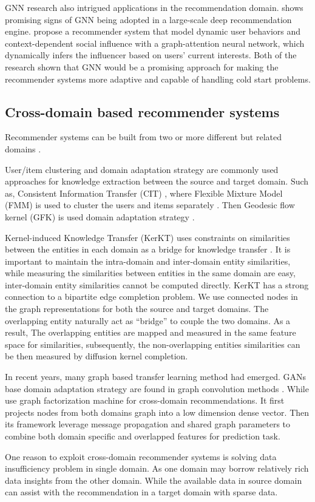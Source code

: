 GNN research also intrigued applications in the recommendation domain. \citet{ying2018graph} shows promising signs of GNN being adopted in a large-scale deep recommendation engine. \citet{song2019session} propose a recommender system that model dynamic user behaviors and context-dependent social influence with a graph-attention neural network, which dynamically infers the influencer based on users’ current interests. Both of the research shown that GNN would be a promising approach for making the recommender systems more adaptive and capable of handling cold start problems.

\subsection{Cross-domain based recommender systems}
Recommender systems can be built from two or more different but related domains \citep{fernandez2012cross}.

User/item clustering and domain adaptation strategy are commonly used approaches for knowledge extraction between the source and target domain. Such as, Consistent Information Transfer (CIT) \citep{zhang2017cross}, where Flexible Mixture Model (FMM) is used to cluster the users and items separately \citep{si2003flexible}. Then Geodesic flow kernel (GFK) is used domain adaptation strategy \citep{gong2014learning}.

Kernel-induced Knowledge Transfer (KerKT) uses constraints on similarities between the entities in each domain as a bridge for knowledge transfer \citep{zhang2018cross}. It is important to maintain the intra-domain and inter-domain entity similarities, while measuring the similarities between entities in the same domain are easy, inter-domain entity similarities cannot be computed directly.
KerKT has a strong connection to a bipartite edge completion problem\citep{he2016birank}. We use connected nodes in the graph representations for both the source and target domains. The overlapping entity naturally act as “bridge” to couple the two domains.
As a result, The overlapping entities are mapped and measured in the same feature space for similarities, subsequently, the non-overlapping entities similarities can be then measured by diffusion kernel completion.

In recent years, many graph based transfer learning method had emerged. GANs \citep{goodfellow2014generative} base domain adaptation strategy are found in graph convolution methods \citep{dai2019network}. While \citet{xi2020graph} use graph factorization machine for cross-domain recommendations. It first projects nodes from both domains graph into a low dimension dense vector. Then its framework leverage message propagation and shared graph parameters to combine both domain specific and overlapped features for prediction task.

One reason to exploit cross-domain recommender systems is solving data insufficiency problem in single domain. As one domain may borrow relatively rich data insights from the other domain. While the available data in source domain can assist with the recommendation in a target domain with sparse data. 


